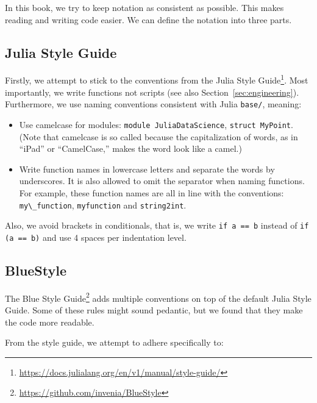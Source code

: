 \documentclass[
  notoc %
]{tufte-book}
\DeclareRobustCommand{\href}[2]{#2\footnote{\url{#1}}}
\providecommand{\tightlist}{%
  \setlength{\itemsep}{0pt}\setlength{\parskip}{0pt}
}
\newcommand{\passthrough}[1]{#1}
\begin{document}
In this book, we try to keep notation as consistent as possible. This
makes reading and writing code easier. We can define the notation into
three parts.

\hypertarget{julia-style-guide}{%
\subsection{Julia Style Guide}\label{julia-style-guide}}

Firstly, we attempt to stick to the conventions from the
\href{https://docs.julialang.org/en/v1/manual/style-guide/}{Julia Style
Guide}. Most importantly, we write functions not scripts (see also
Section~\ref{sec:engineering}). Furthermore, we use naming conventions
consistent with Julia \passthrough{\lstinline!base/!}, meaning:

\begin{itemize}
\tightlist
\item
  Use camelcase for modules:
  \passthrough{\lstinline!module JuliaDataScience!},
  \passthrough{\lstinline!struct MyPoint!}. (Note that camelcase is so
  called because the capitalization of words, as in ``iPad'' or
  ``CamelCase,'' makes the word look like a camel.)
\item
  Write function names in lowercase letters and separate the words by
  underscores. It is also allowed to omit the separator when naming
  functions. For example, these function names are all in line with the
  conventions: \passthrough{\lstinline!my\_function!},
  \passthrough{\lstinline!myfunction!} and
  \passthrough{\lstinline!string2int!}.
\end{itemize}

Also, we avoid brackets in conditionals, that is, we write
\passthrough{\lstinline!if a == b!} instead of
\passthrough{\lstinline!if (a == b)!} and use 4 spaces per indentation
level.

\hypertarget{bluestyle}{%
\subsection{BlueStyle}\label{bluestyle}}

The \href{https://github.com/invenia/BlueStyle}{Blue Style Guide} adds
multiple conventions on top of the default Julia Style Guide. Some of
these rules might sound pedantic, but we found that they make the code
more readable.

From the style guide, we attempt to adhere specifically to:
\end{document}
